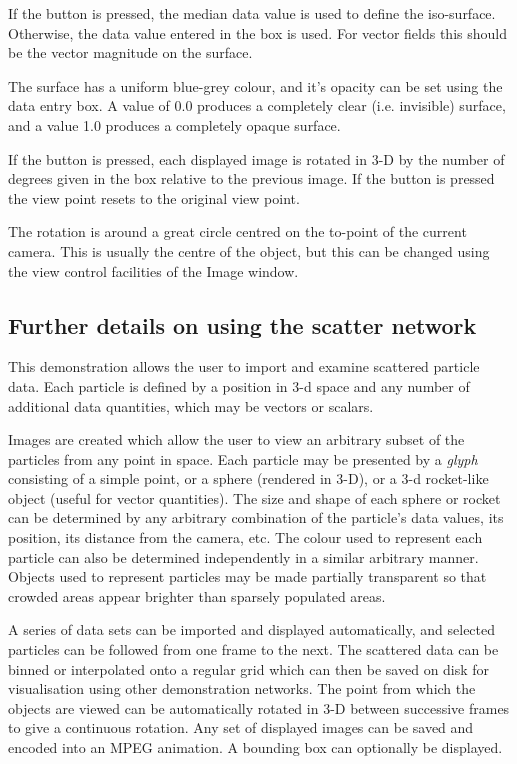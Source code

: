 \begin{description}
If the  button is pressed, the median
data value is used to define the iso-surface. Otherwise, the data value
entered in the  box is used. For vector fields
this should be the vector magnitude on the surface.

The surface has a uniform blue-grey colour, and it's opacity can be set
using the  data entry box. A value of 0.0
produces a completely clear (i.e. invisible) surface, and a value 1.0
produces a completely opaque surface.

If the  button is pressed, each displayed image
is rotated in 3-D by the number of degrees given in the  box relative to the previous image. If the  button
is pressed the view point resets to the original view point.

The rotation is around a great circle centred on the to-point of the
current camera. This is usually the centre of the object, but this can be
changed using the view control facilities of the Image window.

\end{description}


\subsection{\label{scatter}Further details on using the {\bf scatter} network}
This demonstration allows the user to import and examine scattered
particle data. Each particle is defined by a position in 3-d
space and any number of additional data quantities, which may be vectors
or scalars.

Images are created which allow the user to view an arbitrary subset of
the particles from any point in space. Each particle may be presented by
a {\em glyph} consisting of a simple point, or a sphere (rendered in
3-D),
or a 3-d rocket-like object (useful for vector quantities). The size and shape of
each sphere or rocket can be determined by any arbitrary combination of
the particle's data values, its position, its distance from the camera,
etc.  The colour used to represent each particle can also be determined
independently in a similar arbitrary manner. Objects used to represent
particles may be made partially transparent so that crowded areas
appear brighter than sparsely populated areas.

A series of data sets can be imported and displayed automatically, and
selected particles can be followed from one frame to the next.
The scattered data can be binned or interpolated onto a regular grid
which can then be saved on disk for visualisation using other demonstration
networks.
The point from which the objects are viewed can be automatically rotated
in 3-D between successive frames to give a continuous rotation.
Any set of displayed images can be saved and encoded into an MPEG
animation.
A bounding box can optionally be displayed.

